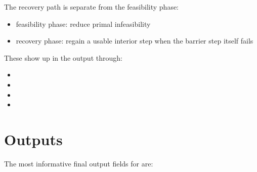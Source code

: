 \documentclass[letterpaper,10pt,english]{sphinxmanual}
\begin{document}
\sphinxAtStartPar
The recovery path is separate from the feasibility phase:
\begin{itemize}
\item {} 
\sphinxAtStartPar
feasibility phase: reduce primal infeasibility

\item {} 
\sphinxAtStartPar
recovery phase: regain a usable interior step when the barrier step itself fails

\end{itemize}

\sphinxAtStartPar
These show up in the output through:
\begin{itemize}
\item {} 
\sphinxAtStartPar
{}

\item {} 
\sphinxAtStartPar
{}

\item {} 
\sphinxAtStartPar
{}

\item {} 
\sphinxAtStartPar
{}

\end{itemize}


\section{Outputs}
\label{\detokenize{optima_internal_protocol:outputs}}
\sphinxAtStartPar
The most informative final output fields for  are:
\end{document}
